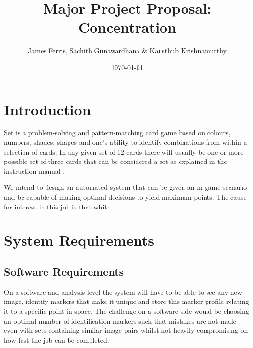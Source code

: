 \documentclass[dvips,12pt]{article}
\begin{document}

\title{Major Project Proposal: Concentration}
\author{James Ferris, Sachith Gunawardhana \& Kausthub Krishnamurthy}
\date{\today}



\maketitle


\section{Introduction}


Set is a problem-solving and pattern-matching card game based on colours, numbers, shades, shapes and one's ability to identify combinations from within a selection of cards. In any given set of 12 cards there will usually be one or more possible set of three cards that can be considered a set as explained in the instruction manual \cite{setInstructions}.

We intend to design an automated system that can be given an in game scenario and be capable of making optimal decisions to yield maximum points. The cause for interest in this job is that while 

\section{System Requirements}
	\subsection{Software Requirements}
		On a software and analysis level the system will have to be able to see any new image, identify markers that make it unique and store this marker profile relating it to a specific point in space. The challenge on a software side would be choosing an optimal number of  identification markers such that mistakes are not made even with sets containing similar image pairs whilst not heavily compromising on how fast the job can be completed.
\end{document}
